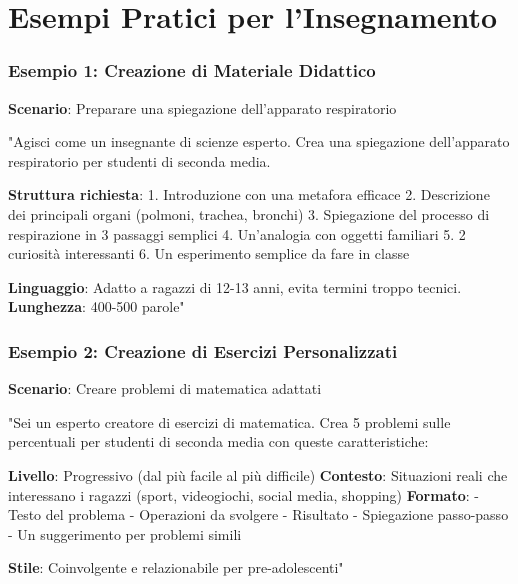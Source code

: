 \documentclass[aspectratio=169]{beamer}
\begin{document}
\section{Esempi Pratici per l'Insegnamento}
%
%
\begin{frame}
\frametitle{Esempio 1: Creazione di Materiale Didattico}
\textbf{Scenario}: Preparare una spiegazione dell'apparato respiratorio

\begin{examplebox}
"Agisci come un insegnante di scienze esperto. Crea una spiegazione dell'apparato respiratorio per studenti di seconda media. 

\textbf{Struttura richiesta}:
1. Introduzione con una metafora efficace
2. Descrizione dei principali organi (polmoni, trachea, bronchi)
3. Spiegazione del processo di respirazione in 3 passaggi semplici
4. Un'analogia con oggetti familiari
5. 2 curiosità interessanti
6. Un esperimento semplice da fare in classe

\textbf{Linguaggio}: Adatto a ragazzi di 12-13 anni, evita termini troppo tecnici.
\textbf{Lunghezza}: 400-500 parole"
\end{examplebox}
\end{frame}
%
%
\begin{frame}
\frametitle{Esempio 2: Creazione di Esercizi Personalizzati}
\textbf{Scenario}: Creare problemi di matematica adattati

\begin{examplebox}
"Sei un esperto creatore di esercizi di matematica. Crea 5 problemi sulle percentuali per studenti di seconda media con queste caratteristiche:

\textbf{Livello}: Progressivo (dal più facile al più difficile)
\textbf{Contesto}: Situazioni reali che interessano i ragazzi (sport, videogiochi, social media, shopping)
\textbf{Formato}: 
- Testo del problema
- Operazioni da svolgere
- Risultato
- Spiegazione passo-passo
- Un suggerimento per problemi simili

\textbf{Stile}: Coinvolgente e relazionabile per pre-adolescenti"
\end{examplebox}
\end{frame}
%
%
\end{document}
